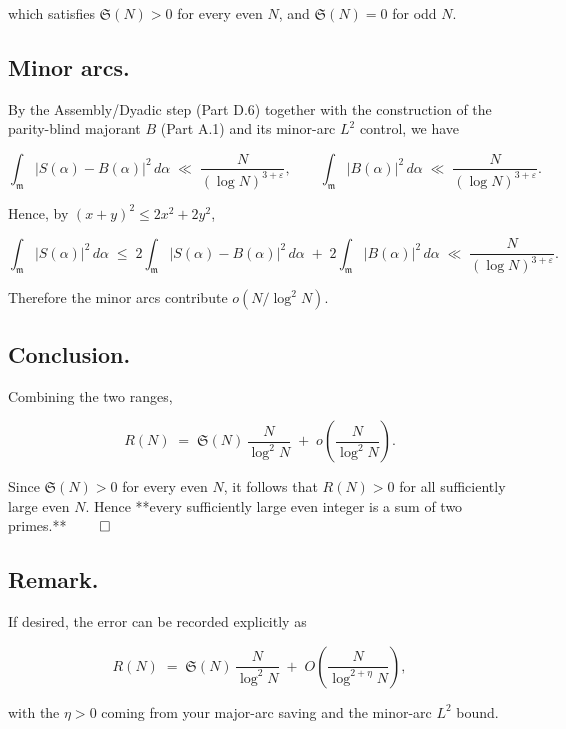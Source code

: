 \documentclass[11pt]{article}
\theoremstyle{definition}
\theoremstyle{remark}
\begin{document}
which satisfies $\mathfrak S(N)>0$ for every even $N$, and $\mathfrak S(N)=0$ for odd $N$.

\subsection*{Minor arcs.}

By the Assembly/Dyadic step (Part D.6) together with the construction of the parity-blind majorant $B$ (Part A.1) and its minor-arc $L^2$ control, we have

$$
\int_{\mathfrak m} |S(\alpha)-B(\alpha)|^2\,d\alpha
\;\ll\;\frac{N}{(\log N)^{3+\varepsilon}},
\qquad
\int_{\mathfrak m} |B(\alpha)|^2\,d\alpha
\;\ll\;\frac{N}{(\log N)^{3+\varepsilon}}.
$$

Hence, by $(x+y)^2\le 2x^2+2y^2$,

$$
\int_{\mathfrak m} |S(\alpha)|^2\,d\alpha
\;\le\;2\!\int_{\mathfrak m}\!|S(\alpha)-B(\alpha)|^2\,d\alpha
\;+\;2\!\int_{\mathfrak m}\!|B(\alpha)|^2\,d\alpha
\;\ll\;\frac{N}{(\log N)^{3+\varepsilon}}.
$$

Therefore the minor arcs contribute $o\!\left(N/\log^2 N\right)$.

\subsection*{Conclusion.}

Combining the two ranges,

$$
R(N)
\;=\;\mathfrak S(N)\,\frac{N}{\log^2 N}\;+\;o\!\left(\frac{N}{\log^2 N}\right).
$$

Since $\mathfrak S(N)>0$ for every even $N$, it follows that $R(N)>0$ for all sufficiently large even $N$. Hence **every sufficiently large even integer is a sum of two primes.** $\qed$

\subsection*{Remark.} 
If desired, the error can be recorded explicitly as

$$
R(N)\;=\;\mathfrak S(N)\,\frac{N}{\log^2 N}\;+\;O\!\left(\frac{N}{\log^{2+\eta}N}\right),
$$

with the $\eta>0$ coming from your major-arc saving and the minor-arc $L^2$ bound.
\end{document}
